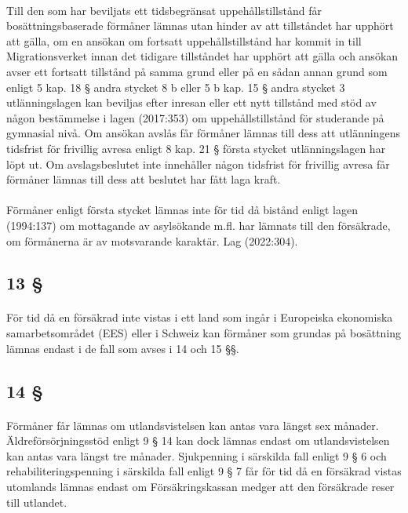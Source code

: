 \documentclass[a4paper,notitlepage,openany,10pt]{book}
\begin{document}
\paragraph*{}
Till den som har beviljats ett tidsbegränsat uppehållstillstånd får bosättningsbaserade förmåner lämnas utan hinder av att tillståndet har upphört att gälla, om en ansökan om fortsatt uppehållstillstånd har kommit in till Migrationsverket innan det tidigare tillståndet har upphört att gälla och ansökan avser ett fortsatt tillstånd på samma grund eller på en sådan annan grund som enligt 5 kap. 18 § andra stycket 8 b eller 5 b kap. 15 § andra stycket 3 utlänningslagen kan beviljas efter inresan eller ett nytt tillstånd med stöd av någon bestämmelse i lagen (2017:353) om uppehållstillstånd för studerande på gymnasial nivå. Om ansökan avslås får förmåner lämnas till dess att utlänningens tidsfrist för frivillig avresa enligt 8 kap. 21 § första stycket utlänningslagen har löpt ut. Om avslagsbeslutet inte innehåller någon tidsfrist för frivillig avresa får förmåner lämnas till dess att beslutet har fått laga kraft.
\paragraph*{}
Förmåner enligt första stycket lämnas inte för tid då bistånd enligt lagen (1994:137) om mottagande av asylsökande m.fl. har lämnats till den försäkrade, om förmånerna är av motsvarande karaktär.
Lag (2022:304).
\subsection*{13 §}
\paragraph*{}
För tid då en försäkrad inte vistas i ett land som ingår i Europeiska ekonomiska samarbetsområdet (EES) eller i Schweiz kan förmåner som grundas på bosättning lämnas endast i de fall som avses i 14 och 15 §§.
\subsection*{14 §}
\paragraph*{}
Förmåner får lämnas om utlandsvistelsen kan antas vara längst sex månader. Äldreförsörjningsstöd enligt 9 § 14 kan dock lämnas endast om utlandsvistelsen kan antas vara längst tre månader. Sjukpenning i särskilda fall enligt 9 § 6 och rehabiliteringspenning i särskilda fall enligt 9 § 7 får för tid då en försäkrad vistas utomlands lämnas endast om Försäkringskassan medger att den försäkrade reser till utlandet.
\end{document}
